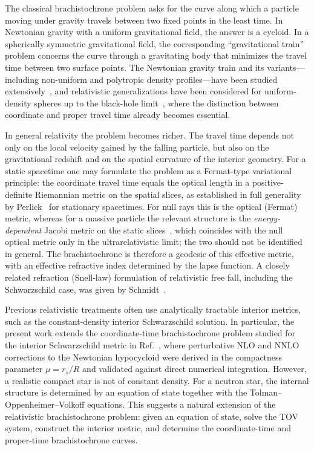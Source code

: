 \documentclass[
  aps,
  prd,
  twocolumn,
  nofootinbib,
  superscriptaddress,
  longbibliography
]{revtex4-2}
\begin{document}
The classical brachistochrone problem asks for the curve along which a
particle moving under gravity travels between two fixed points in the
least time. In Newtonian gravity with a uniform gravitational field,
the answer is a cycloid. In a spherically symmetric gravitational
field, the corresponding ``gravitational train'' problem concerns the
curve through a gravitating body that minimizes the travel time between
two surface points. The Newtonian gravity train and its
variants---including non-uniform and polytropic density
profiles---have been studied extensively~\cite{Klotz2015,GjerlovPesnell2019},
and relativistic generalizations have been considered for
uniform-density spheres up to the black-hole limit~\cite{Parker2017,Seel2018},
where the distinction between coordinate and proper travel time already
becomes essential.

In general relativity the problem becomes richer. The travel time
depends not only on the local velocity gained by the falling particle,
but also on the gravitational redshift and on the spatial curvature of
the interior geometry. For a static spacetime one may formulate the
problem as a Fermat-type variational principle: the coordinate travel
time equals the optical length in a positive-definite Riemannian
metric on the spatial slices, as established in
full generality by Perlick~\cite{Perlick1990} for stationary
spacetimes. For null rays this is the optical (Fermat) metric, whereas
for a massive particle the relevant structure is the \emph{energy-dependent}
Jacobi metric on the static slices~\cite{Gibbons2016}, which coincides
with the null optical metric only in the ultrarelativistic limit; the
two should not be identified in general.
The brachistochrone is therefore a geodesic of this effective metric,
with an effective refractive index determined by the lapse function. A
closely related refraction (Snell-law) formulation of relativistic free
fall, including the Schwarzschild case, was given by
Schmidt~\cite{Schmidt2018}.

Previous relativistic treatments often use analytically tractable
interior metrics, such as the constant-density interior Schwarzschild
solution. In particular, the present work extends the coordinate-time
brachistochrone problem studied for the interior Schwarzschild metric
in Ref.~\cite{Rosignoli2026}, where perturbative NLO and NNLO
corrections to the Newtonian hypocycloid were derived in the
compactness parameter $\mu=r_s/R$ and validated against direct
numerical integration. However, a realistic compact star is not of
constant density. For a neutron star, the internal structure is
determined by an equation of state together with the
Tolman--Oppenheimer--Volkoff equations. This suggests a natural
extension of the relativistic brachistochrone problem: given an
equation of state, solve the TOV system, construct the interior metric,
and determine the coordinate-time and proper-time brachistochrone
curves.
\end{document}
